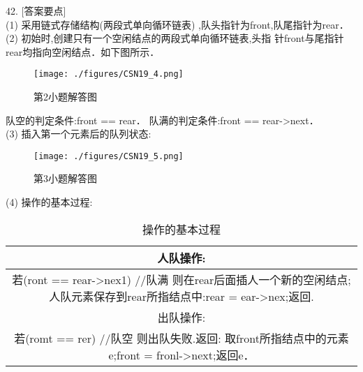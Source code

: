 42. [答案要点] \\
(1) 采用链式存储结构(两段式单向循环链表) ,队头指针为front,队尾指针为rear． \\
(2) 初始时,创建只有一个空闲结点的两段式单向循环链表,头指
针front与尾指针rear均指向空闲结点．如下图所示．
\begin{figure}[ht]
\centering
\texttt{[image: ./figures/CSN19\_4.png]}
\caption{第2小题解答图} \label{CSN19_fig4}
\end{figure}
队空的判定条件:front == rear．
队满的判定条件:front == rear->next． \\
(3) 插入第一个元素后的队列状态:
\begin{figure}[ht]
\centering
\texttt{[image: ./figures/CSN19\_5.png]}
\caption{第3小题解答图} \label{CSN19_fig5}
\end{figure}
(4) 操作的基本过程: \\
\begin{table}[ht]
\centering
\caption{操作的基本过程}\label{CSN19_tab1}
\begin{tabular}{|c|}
\hline
人队操作: \\
\hline
若(ront == rear->nex1)    //队满
则在rear后面插人一个新的空闲结点;
人队元素保存到rear所指结点中:rear = ear->nex;返回. \\
\hline
出队操作: \\
\hline
若(romt == rer)    //队空
则出队失败.返回:
取front所指结点中的元素e;front = fronl->next;返回e． \\
\hline
\end{tabular}
\end{table}